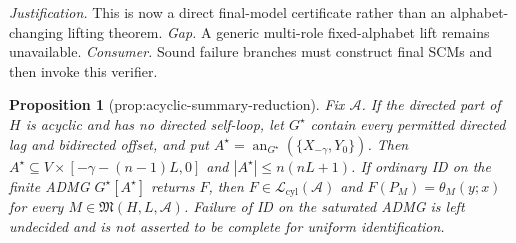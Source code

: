 \documentclass{article}
\newtheorem{proposition}{Proposition}
\begin{document}
\par\smallskip\noindent \textit{Justification.} This is now a direct final-model certificate rather than an alphabet-changing lifting theorem. \textit{Gap.} A generic multi-role fixed-alphabet lift remains unavailable. \textit{Consumer.} Sound failure branches must construct final SCMs and then invoke this verifier.

\begin{proposition}[prop:acyclic-summary-reduction]\label{prop:acyclic-summary-reduction}
Fix \(\mathcal A\).  If the directed part of \(H\) is acyclic and has no directed self-loop, let \(G^\star\) contain every permitted directed lag and bidirected offset, and put \(A^\star=\operatorname{an}_{G^\star}(\{X_{-\gamma},Y_0\})\).  Then \(A^\star\subseteq V\times[-\gamma-(n-1)L,0]\) and \(|A^\star|\le n(nL+1)\).  If ordinary ID on the finite ADMG \(G^\star[A^\star]\) returns \(F\), then \(F\in\mathcal L_{\mathrm{cyl}}(\mathcal A)\) and \(F(P_M)=\theta_M(y;x)\) for every \(M\in\mathfrak M(H,L,\mathcal A)\).  Failure of ID on the saturated ADMG is left undecided and is not asserted to be complete for uniform identification.
\end{proposition}
\end{document}
